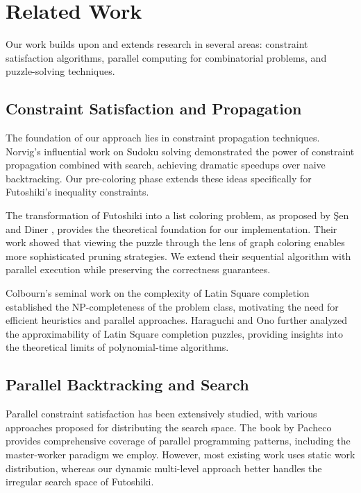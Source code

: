 \section{Related Work}
\label{sec:related_work}
Our work builds upon and extends research in several areas: constraint satisfaction algorithms, parallel computing for combinatorial problems, and puzzle-solving techniques.

\subsection{Constraint Satisfaction and Propagation}
The foundation of our approach lies in constraint propagation techniques. Norvig's influential work on Sudoku solving \cite{NorvigSudoku} demonstrated the power of constraint propagation combined with search, achieving dramatic speedups over naive backtracking. Our pre-coloring phase extends these ideas specifically for Futoshiki's inequality constraints.

The transformation of Futoshiki into a list coloring problem, as proposed by Şen and Diner \cite{Sen2024Futoshiki}, provides the theoretical foundation for our implementation. Their work showed that viewing the puzzle through the lens of graph coloring enables more sophisticated pruning strategies. We extend their sequential algorithm with parallel execution while preserving the correctness guarantees.

Colbourn's seminal work \cite{Colbourn1984} on the complexity of Latin Square completion established the NP-completeness of the problem class, motivating the need for efficient heuristics and parallel approaches. Haraguchi and Ono \cite{Haraguchi2014} further analyzed the approximability of Latin Square completion puzzles, providing insights into the theoretical limits of polynomial-time algorithms.

\subsection{Parallel Backtracking and Search}
Parallel constraint satisfaction has been extensively studied, with various approaches proposed for distributing the search space. The book by Pacheco \cite{Pacheco2011} provides comprehensive coverage of parallel programming patterns, including the master-worker paradigm we employ. However, most existing work uses static work distribution, whereas our dynamic multi-level approach better handles the irregular search space of Futoshiki.

